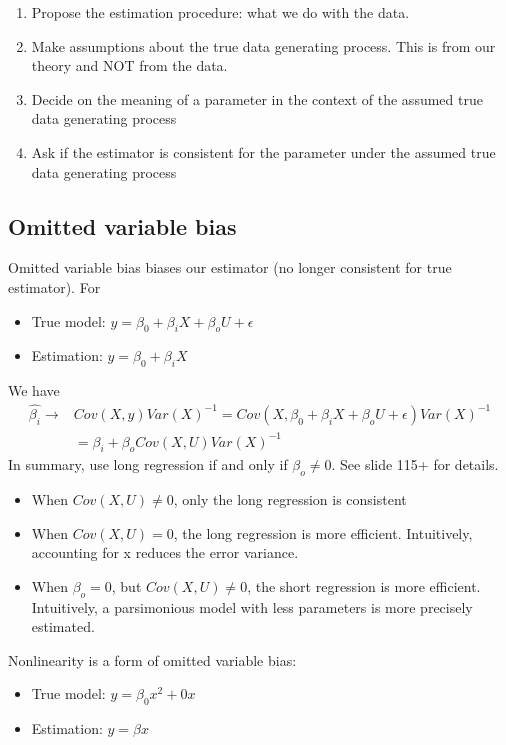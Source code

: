 \documentclass{article}
\begin{document}
\begin{enumerate}
  \item Propose the estimation procedure: what we do with the data.
  \item Make assumptions about the true data generating process. This is from our theory and NOT from the data.
  \item Decide on the meaning of a parameter in the context of the assumed true data generating process
  \item Ask if the estimator is consistent for the parameter under the assumed true data generating process  
\end{enumerate}

\subsection{Omitted variable bias}
Omitted variable bias biases our estimator (no longer consistent for true estimator). For

\begin{itemize}
  \item True model: $y = \beta_0 + \beta_iX + \beta_oU + \epsilon$
  \item Estimation: $y = \beta_0 + \beta_iX$
\end{itemize}
We have
\begin{align*}
  \hat{\beta_i} \longrightarrow& Cov(X, y)Var(X)^{-1} = Cov(X, \beta_0 + \beta_iX + \beta_oU + \epsilon)Var(X)^{-1}\\
  &= \beta_i + \beta_oCov(X, U)Var(X)^{-1}
\end{align*}
In summary, use long regression if and only if $\beta_o \neq 0$. See slide 115+ for details.
\begin{itemize}
  \item When $Cov(X, U) \neq 0$, only the long regression is consistent
  \item When $Cov(X, U) = 0$, the long regression is more efficient. Intuitively, accounting for x reduces the error variance.
  \item When $\beta_o = 0$, but $Cov(X, U) \neq 0$, the short regression is more efficient. Intuitively, a parsimonious model with less parameters is more precisely estimated.
\end{itemize}
Nonlinearity is a form of omitted variable bias: 
\begin{itemize}
  \item True model: $y = \beta_0 x^2 + 0 x$
  \item Estimation: $y = \beta x$
\end{itemize}
\end{document}
